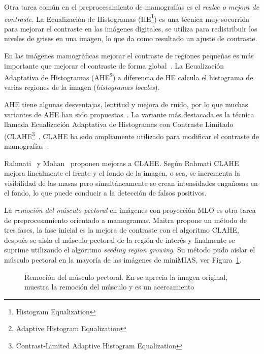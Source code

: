 Otra tarea común en el preprocesamiento de mamografías es el \textit{realce o
mejora de contraste}. La Ecualización de Histogramas (HE\footnote{Histogram
Equalization}) es una técnica muy socorrida para mejorar el contraste en las
imágenes digitales, se utiliza para redistribuir los niveles de grises en una
imagen, lo que da como resultado un ajuste de contraste.

En las imágenes mamográficas mejorar el contraste de regiones pequeñas es más
importante que mejorar el contraste de forma global~\cite{mohan2013modified}.
La Ecualización Adaptativa de Histogramas (AHE\footnote{Adaptive Histogram
Equalization}) a diferencia de HE calcula el histograma de varias regiones de
la imagen (\textit{histogramas locales}).

AHE tiene algunas desventajas, lentitud y mejora de ruido, por lo que muchas
variantes de AHE han sido propuestas~\cite{pizer1987adaptive}. La variante más
destacada es la técnica llamada Ecualización Adaptativa de Histogramas con
Contraste Limitado (CLAHE\footnote{Contrast-Limited Adaptive Histogram
Equalization}~\cite{zuiderveld1994contrast}. CLAHE ha sido ampliamente
utilizado para modificar el contraste de mamografías~\cite{pisano1998contrast,
maitra2012technique}.

Rahmati~\cite{rahmati2010new} y Mohan~\cite{mohan2013modified} proponen mejoras
a CLAHE. Según Rahmati CLAHE mejora linealmente el frente y el fondo de la
imagen, o sea, se incrementa la visibilidad de las masas pero simultáneamente
se crean intensidades engañosas en el fondo, lo que puede conducir a la
detección de falsos positivos.

La \textit{remoción del músculo pectoral} en imágenes con proyección MLO es
otra tarea de preprocesamiento orientado a mamogramas. Maitra propone un método
de tres fases, la fase inicial es la mejora de contraste con el algoritmo
CLAHE, después se aisla el músculo pectoral de la región de interés y
finalmente se suprime utilizando el algoritmo \textit{seeding region growing}.
Su método pudo aislar el músculo pectoral en la mayoría de las imágenes de
miniMIAS, ver Figura~\ref{fig:muscle}.

\begin{figure}[h]
    \centering
    \hspace{1cm}
    \hspace{1cm}
  \caption[Remoción del músculo pectoral]
  {Remoción del músculo pectoral. En \protect{} se aprecia la 
  imagen original, \protect{} muestra la remoción del músculo y 
  \protect{} es un acercamiento}
  \label{fig:muscle}
\end{figure}

